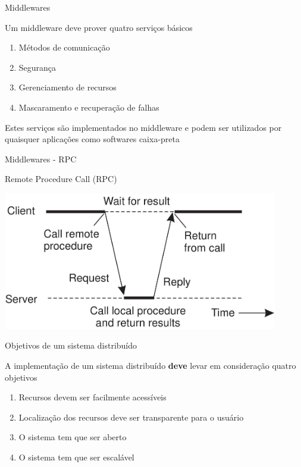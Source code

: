 \documentclass[compress]{beamer}
\begin{document}

\begin{frame}{Middlewares}

Um middleware deve prover quatro serviços básicos
\begin{enumerate}
    \item Métodos de comunicação
    \item Segurança
    \item Gerenciamento de recursos
    \item Mascaramento e recuperação de falhas
\end{enumerate}

\vspace{0.5cm}

Estes serviços são implementados no middleware e podem ser utilizados por quaisquer aplicações como softwares caixa-preta

\end{frame}


\begin{frame}{Middlewares - RPC}

Remote Procedure Call (RPC)

\vspace{1cm}

\centering\includegraphics[width=0.9\textwidth]{images/rpc.png}

\end{frame}


\begin{frame}{Objetivos de um sistema distribuído}

A implementação de um sistema distribuído \textbf{deve} levar em consideração quatro objetivos

\vspace{1cm}

\begin{enumerate}
    \item Recursos devem ser facilmente acessíveis
    \item Localização dos recursos deve ser transparente para o usuário
    \item O sistema tem que ser aberto
    \item O sistema tem que ser escalável
\end{enumerate}

\end{frame}
\end{document}
